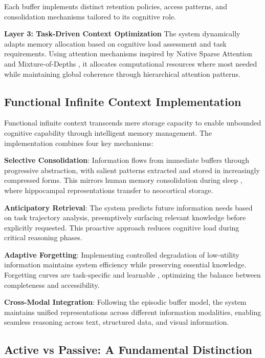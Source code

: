 \documentclass[10pt,twocolumn]{article}
\begin{document}
Each buffer implements distinct retention policies, access patterns, and consolidation mechanisms tailored to its cognitive role.

\textbf{Layer 3: Task-Driven Context Optimization}
The system dynamically adapts memory allocation based on cognitive load assessment and task requirements. Using attention mechanisms inspired by Native Sparse Attention \cite{lu2025native} and Mixture-of-Depths \cite{raposo2024mixture}, it allocates computational resources where most needed while maintaining global coherence through hierarchical attention patterns.

\subsection{Functional Infinite Context Implementation}

Functional infinite context transcends mere storage capacity to enable unbounded cognitive capability through intelligent memory management. The implementation combines four key mechanisms:

\textbf{Selective Consolidation}: Information flows from immediate buffers through progressive abstraction, with salient patterns extracted and stored in increasingly compressed forms. This mirrors human memory consolidation during sleep \cite{diekelmann2010memory}, where hippocampal representations transfer to neocortical storage.

\textbf{Anticipatory Retrieval}: The system predicts future information needs based on task trajectory analysis, preemptively surfacing relevant knowledge before explicitly requested. This proactive approach reduces cognitive load during critical reasoning phases.

\textbf{Adaptive Forgetting}: Implementing controlled degradation of low-utility information maintains system efficiency while preserving essential knowledge. Forgetting curves are task-specific and learnable \cite{wixted2004psychology}, optimizing the balance between completeness and accessibility.

\textbf{Cross-Modal Integration}: Following the episodic buffer model, the system maintains unified representations across different information modalities, enabling seamless reasoning across text, structured data, and visual information.

\subsection{Active vs Passive: A Fundamental Distinction}
\end{document}
